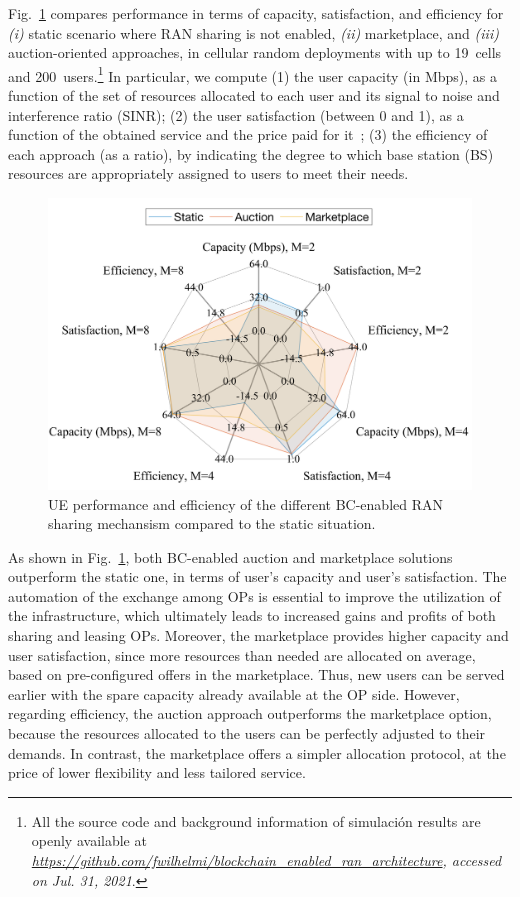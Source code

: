 \documentclass[journal]{IEEEtran}
\begin{document}
Fig.~\ref{fig:performance} compares performance in terms of capacity, satisfaction, and efficiency for \textit{(i)} static scenario where RAN sharing is not enabled, \textit{(ii)} marketplace, and \textit{(iii)} auction-oriented approaches, in cellular random deployments with up to 19~cells and 200~users.\footnote{All the source code and background information of simulación results are openly available at \textit{\url{https://github.com/fwilhelmi/blockchain_enabled_ran_architecture}, accessed on Jul. 31, 2021}.} In particular, we compute (1) the user capacity (in Mbps), as a function of the set of resources allocated to each user and its signal to noise and interference ratio (SINR); (2) the user satisfaction (between 0 and 1), as a function of the obtained service and the price paid for it~\cite{giupponi2008novel}; (3) the efficiency of each approach (as a ratio), by indicating the degree to which base station (BS) resources are appropriately assigned to users to meet their needs. %

\begin{figure}[ht!]
\centering
\includegraphics[width=.9\linewidth]{spiderplot.png}
\caption{UE performance and efficiency of the different BC-enabled RAN sharing mechansism compared to the static situation.}
\label{fig:performance}
\end{figure}

As shown in Fig.~\ref{fig:performance}, both BC-enabled auction and marketplace solutions outperform the static one, in terms of user's capacity and user's satisfaction. The automation of the exchange among OPs is essential to improve the utilization of the infrastructure, which ultimately leads to increased gains and profits of both sharing and leasing OPs. Moreover, the marketplace provides higher capacity and user satisfaction, since more resources than needed are allocated on average, based on pre-configured offers in the marketplace. Thus, new users can be served earlier with the spare capacity already available at the OP side. However, regarding efficiency, the auction approach outperforms the marketplace option, because the resources allocated to the users can be perfectly adjusted to their demands. In contrast, the marketplace offers a simpler allocation protocol, at the price of lower flexibility and less tailored service.
\end{document}
